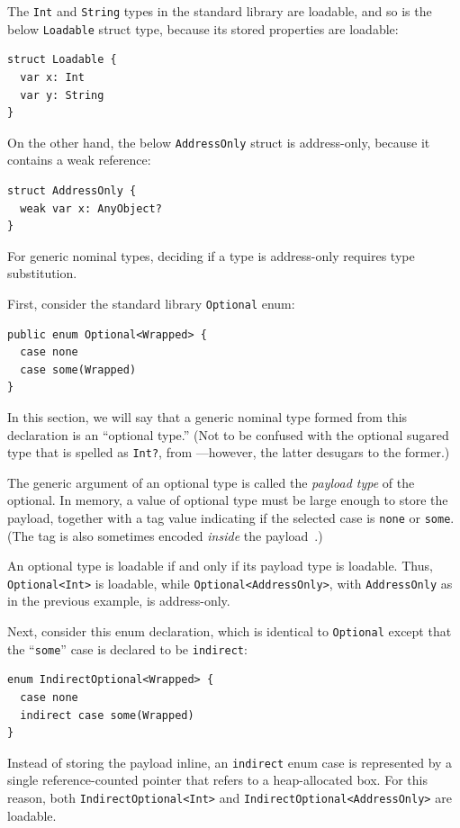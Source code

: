 \documentclass[../generics]{subfiles}
\begin{document}
\begin{example}\label{ex:loadable address only 1}
The \texttt{Int} and \texttt{String} types in the standard library are loadable, and so is the below \texttt{Loadable} struct type, because its stored properties are loadable:
\begin{Verbatim}
struct Loadable {
  var x: Int
  var y: String
}
\end{Verbatim}
On the other hand, the below \texttt{AddressOnly} struct is address-only, because it contains a weak reference:
\begin{Verbatim}
struct AddressOnly {
  weak var x: AnyObject?
}
\end{Verbatim}
\end{example}

For generic nominal types, deciding if a type is address-only requires type substitution.

\begin{example}\label{ex:lowering optional}
First, consider the standard library \texttt{Optional} enum:
\begin{Verbatim}
public enum Optional<Wrapped> {
  case none
  case some(Wrapped)
}
\end{Verbatim}
In this section, we will say that a generic nominal type formed from this declaration is an ``optional type.'' (Not to be confused with the optional sugared type that is spelled as \texttt{Int?}, from ---however, the latter desugars to the former.)

The generic argument of an optional type is called the \emph{payload type} of the optional. In memory, a value of optional type must be large enough to store the payload, together with a tag value indicating if the selected case is \texttt{none} or \texttt{some}. (The tag is also sometimes encoded \emph{inside} the payload~\cite{typelayout}.)

An optional type is loadable if and only if its payload type is loadable. Thus, \texttt{Optional<Int>} is loadable, while \texttt{Optional<AddressOnly>}, with \texttt{AddressOnly} as in the previous example, is address-only.
\end{example}

\begin{example}
Next, consider this enum declaration, which is identical to \texttt{Optional} except that the ``\texttt{some}'' case is declared to be \texttt{indirect}:
\begin{Verbatim}
enum IndirectOptional<Wrapped> {
  case none
  indirect case some(Wrapped)
}
\end{Verbatim}
Instead of storing the payload inline, an \texttt{indirect} enum case is represented by a single reference-counted pointer that refers to a heap-allocated box. For this reason, both \texttt{IndirectOptional<Int>} and \texttt{IndirectOptional<AddressOnly>} are loadable.
\end{example}
\end{document}
